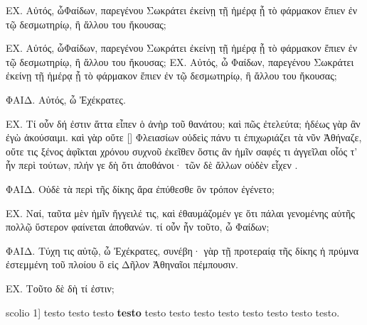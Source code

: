 \documentclass[11pt,a4paper]{book}
\makeatletter
\renewcommand{\thepstart}{{\makebox[2mm][r]{\bf\@arabic\c@pstart}}\hspace{3mm}}
\newcounter{para}[chapter]\setcounter{para}{0}
\newcommand{\newpara}{%
    \refstepcounter{para}%
    \noindent\llap{\thepstart}}
\makeatother
\begin{document}
\begin{minipage}{0.7\textwidth}
\beginnumbering
\pstart
ΕΧ. Αὐτός, ὦΦαίδων, παρεγένου Σωκράτει ἐκείνῃ τῇ ἡμέρᾳ ᾗ τὸ φάρμακον ἔπιεν ἐν τῷ δεσμωτηρίῳ, ἢ ἄλλου του ἤκουσας;
\pend
\endnumbering
\end{minipage}
\beginnumbering
\pstart
ΕΧ. Αὐτός, ὦΦαίδων, παρεγένου Σωκράτει ἐκείνῃ τῇ ἡμέρᾳ ᾗ τὸ φάρμακον ἔπιεν ἐν τῷ δεσμωτηρίῳ, ἢ ἄλλου του ἤκουσας;
\pend
\pstart
{}ΕΧ. Αὐτός, ὦ Φαίδων, παρεγένου Σωκράτει ἐκείνῃ τῇ ἡμέρᾳ ᾗ τὸ φάρμακον ἔπιεν ἐν τῷ δεσμωτηρίῳ, ἢ ἄλλου του ἤκουσας;

ΦΑΙΔ. Αὐτός, ὦ Ἐχέκρατες.

ΕΧ. Τί οὖν δή ἐστιν ἅττα εἶπεν ὁ ἀνὴρ  τοῦ θανάτου; καὶ πῶς ἐτελεύτα; ἡδέως γὰρ ἂν ἐγὼ ἀκούσαιμι. καὶ γὰρ οὔτε [] Φλειασίων οὐδεὶς πάνυ τι ἐπιχωριάζει τὰ νῦν Ἀθήναζε, οὔτε τις ξένος ἀφῖκται χρόνου συχνοῦ ἐκεῖθεν ὅστις ἂν ἡμῖν σαφές τι ἀγγεῖλαι οἷός τ' ἦν περὶ τούτων, πλήν γε δὴ ὅτι   ἀποθάνοι· τῶν δὲ ἄλλων οὐδὲν εἶχεν .

ΦΑΙΔ. Οὐδὲ τὰ περὶ τῆς δίκης ἄρα ἐπύθεσθε ὃν τρόπον ἐγένετο;

ΕΧ. Ναί, ταῦτα μὲν ἡμῖν ἤγγειλέ τις, καὶ ἐθαυμάζομέν γε ὅτι πάλαι γενομένης αὐτῆς πολλῷ ὕστερον φαίνεται ἀποθανών. τί οὖν ἦν τοῦτο, ὦ Φαίδων;

ΦΑΙΔ. Τύχη τις αὐτῷ, ὦ Ἐχέκρατες, συνέβη·  γὰρ τῇ προτεραίᾳ τῆς δίκης ἡ πρύμνα ἐστεμμένη τοῦ πλοίου ὃ εἰς Δῆλον Ἀθηναῖοι πέμπουσιν.

ΕΧ. Τοῦτο δὲ δὴ τί ἐστιν; 
\pend

\setcounter{pstart}{1}
\numberpstarttrue
    \pstart\newpara \label{scolio1}scolio 1] testo  testo testo \textbf{testo} testo testo testo testo testo testo testo testo.\pend
\end{document}

